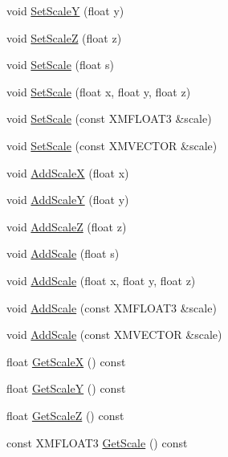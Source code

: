 \begin{DoxyCompactItemize}
void \hyperlink{classmage_1_1_transform_node_ab1a6ee55cb794b8261256ff57897e431}{Set\+ScaleY} (float y)
\item 
void \hyperlink{classmage_1_1_transform_node_a62f30bfad36c464435e67a4236ceb5a7}{Set\+ScaleZ} (float z)
\item 
void \hyperlink{classmage_1_1_transform_node_af85bcef02284aab46c597dde0331c7de}{Set\+Scale} (float s)
\item 
void \hyperlink{classmage_1_1_transform_node_a2921532479b9d41a4df04ef298dc0e20}{Set\+Scale} (float x, float y, float z)
\item 
void \hyperlink{classmage_1_1_transform_node_a6019d0e02c09760f20f9a8abf3b783ac}{Set\+Scale} (const X\+M\+F\+L\+O\+A\+T3 \&scale)
\item 
void \hyperlink{classmage_1_1_transform_node_aa6687706161a791a2c860a0b7e6da771}{Set\+Scale} (const X\+M\+V\+E\+C\+T\+OR \&scale)
\item 
void \hyperlink{classmage_1_1_transform_node_a9e12626e4abfb276a0567b95837e4a7d}{Add\+ScaleX} (float x)
\item 
void \hyperlink{classmage_1_1_transform_node_a93d9e82aa43debc580f597d0d8d134a5}{Add\+ScaleY} (float y)
\item 
void \hyperlink{classmage_1_1_transform_node_ae17682011d5b1f5e8c4e5046bbe17028}{Add\+ScaleZ} (float z)
\item 
void \hyperlink{classmage_1_1_transform_node_a819b084b2907f629d0cfd47a279daca6}{Add\+Scale} (float s)
\item 
void \hyperlink{classmage_1_1_transform_node_af77e42c0d780c47e89000b789e3e44a0}{Add\+Scale} (float x, float y, float z)
\item 
void \hyperlink{classmage_1_1_transform_node_abb31197ec1174ef623081eec816c3664}{Add\+Scale} (const X\+M\+F\+L\+O\+A\+T3 \&scale)
\item 
void \hyperlink{classmage_1_1_transform_node_ae228da7128c88b117075433c75b97fee}{Add\+Scale} (const X\+M\+V\+E\+C\+T\+OR \&scale)
\item 
float \hyperlink{classmage_1_1_transform_node_a465204839a047c6cddbb551a549da741}{Get\+ScaleX} () const
\item 
float \hyperlink{classmage_1_1_transform_node_a8b4023dc2dd9a62012ee0aa36ec022b5}{Get\+ScaleY} () const
\item 
float \hyperlink{classmage_1_1_transform_node_afba2781f69e1abe50b9a2ad87f641439}{Get\+ScaleZ} () const
\item 
const X\+M\+F\+L\+O\+A\+T3 \hyperlink{classmage_1_1_transform_node_acb0846fdaf70a8a88c4fe316032b5a0c}{Get\+Scale} () const

\end{DoxyCompactItemize}
